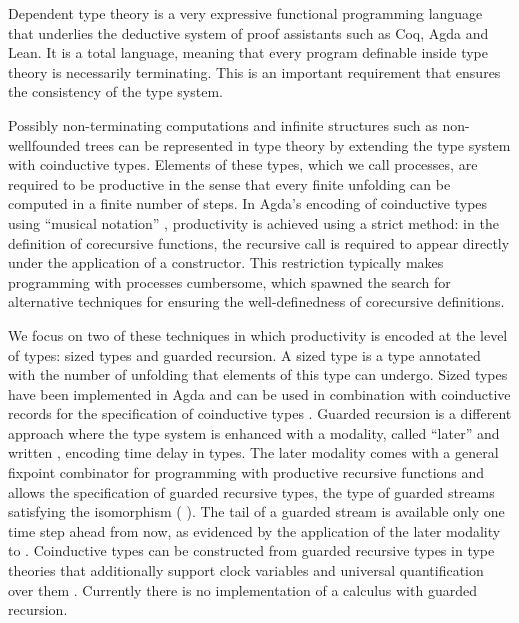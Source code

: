 Dependent type theory is a very expressive functional programming
language that underlies the deductive system of proof assistants such
as Coq, Agda and Lean.  It is a total language,
meaning that every program definable inside type theory is necessarily
terminating. This is an important requirement that ensures the
consistency of the type system. 

Possibly non-terminating computations
and infinite structures such as non-wellfounded trees can be
represented in type theory by extending the type system with
coinductive types. Elements of these types, which we call processes,
are required to be productive \cite{Coquand93} in the sense that every
finite unfolding can be computed in a finite number of steps.
In Agda's encoding of coinductive types using ``musical notation''
\cite{DA10} , productivity is achieved using a strict method: in the
definition of corecursive functions, the recursive
call is required to appear directly under
the application of a constructor. This restriction
typically makes programming with processes cumbersome,
which spawned the search for alternative techniques for ensuring the
well-definedness of corecursive definitions.

We focus on two of these techniques in which productivity is encoded
at the level of types: sized types and guarded recursion. A sized type
\cite{Hughes96} is a type annotated with the number of unfolding that
elements of this type can undergo. Sized types have been implemented
in Agda \cite{A-sized,AVW-normalization} and can be used in
combination with coinductive records for the specification of
coinductive types \cite{Copatterns}.  Guarded recursion \cite{Nakano}
is a different approach where the type system is enhanced with a
modality, called ``later'' and written , encoding time delay in
types. The later modality comes with a general fixpoint combinator for
programming with productive recursive functions and allows the
specification of guarded recursive types, \eg the type of guarded
streams satisfying the isomorphism     
 ( ). The tail of a guarded stream is available only
one time step ahead from now, as evidenced by the application of the
later modality to  . Coinductive types can be constructed
from guarded recursive types in type theories that additionally
support clock variables and universal quantification over them
\cite{atkey2013productive,BahrGM17}. Currently there is no
implementation of a calculus with guarded recursion.

